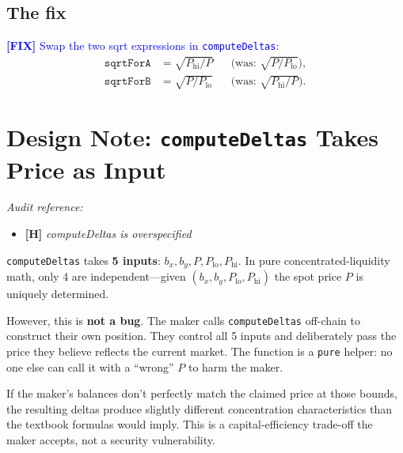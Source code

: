 \documentclass[11pt]{article}
\theoremstyle{definition}
\newcommand{\fix}[1]{\textcolor{blue}{\textbf{[FIX]} #1}}
\begin{document}
\subsection{The fix}

\fix{Swap the two sqrt expressions in \texttt{computeDeltas}:}
\begin{align*}
\texttt{sqrtForA} &= \sqrt{P_{\mathrm{hi}} / P} &
  &\text{(was: $\sqrt{P / P_{\mathrm{lo}}}$)}, \\
\texttt{sqrtForB} &= \sqrt{P / P_{\mathrm{lo}}} &
  &\text{(was: $\sqrt{P_{\mathrm{hi}} / P}$)}.
\end{align*}


\section{Design Note: \texttt{computeDeltas} Takes Price as Input}\label{sec:overconstrained}

\noindent\textit{Audit reference:}
\begin{itemize}[nosep,leftmargin=2em]
\item \textbf{[H]} \textit{computeDeltas is overspecified}
\end{itemize}

\medskip
\texttt{computeDeltas} takes \textbf{5 inputs}: $b_x, b_y, P, P_{\mathrm{lo}}, P_{\mathrm{hi}}$.
In pure concentrated-liquidity math, only 4 are independent---given
$(b_x, b_y, P_{\mathrm{lo}}, P_{\mathrm{hi}})$ the spot price $P$ is uniquely
determined.

However, this is \textbf{not a bug}.
The maker calls \texttt{computeDeltas} off-chain to construct their own
position.  They control all 5 inputs and deliberately pass the price they
believe reflects the current market.  The function is a \texttt{pure} helper:
no one else can call it with a ``wrong'' $P$ to harm the maker.

If the maker's balances don't perfectly match the claimed price at those bounds,
the resulting deltas produce slightly different concentration characteristics
than the textbook formulas would imply.  This is a capital-efficiency trade-off
the maker accepts, not a security vulnerability.
\end{document}
